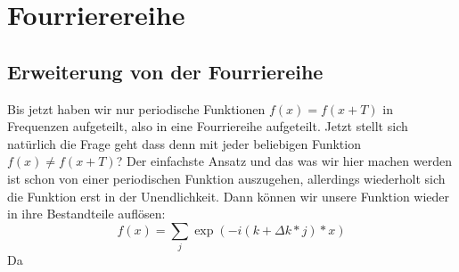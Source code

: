 \section{Fourrierereihe}
\subsection{Erweiterung von der Fourriereihe}
Bis jetzt haben wir nur periodische Funktionen $f(x) = f(x+T)$ in Frequenzen aufgeteilt, also in eine Fourriereihe aufgeteilt. Jetzt stellt sich natürlich die Frage geht dass denn mit jeder beliebigen Funktion $f(x) \neq f(x+T)$?
Der einfachste Ansatz und das was wir hier machen werden ist schon von einer periodischen Funktion auszugehen, allerdings wiederholt sich die Funktion erst in der Unendlichkeit.
Dann können wir unsere Funktion wieder in ihre Bestandteile auflösen:
\begin{equation}
	f(x) = \sum_j \exp (-i (k+\Delta k *j) *x)
\end{equation}
Da
